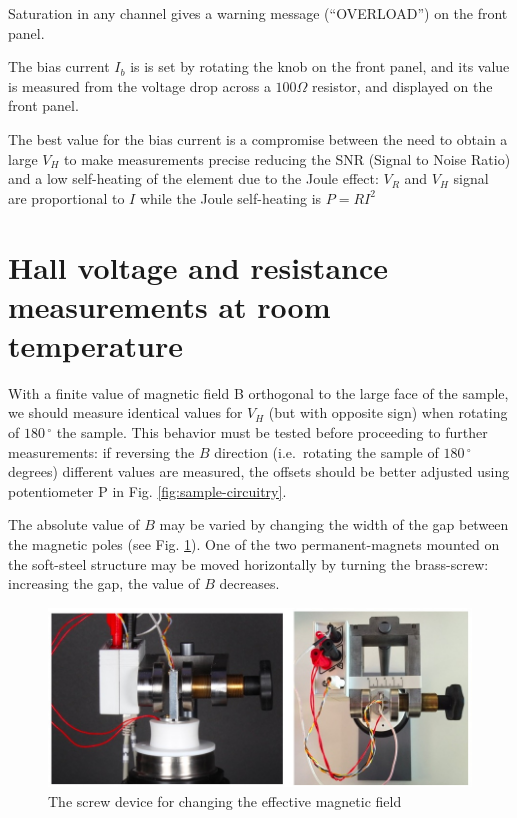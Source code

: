 \documentclass[]{book}
\begin{document}
Saturation in any channel gives a warning message (``OVERLOAD'') on the
front panel.

The bias current \(I_b\) is is set by rotating the knob on the front
panel, and its value is measured from the voltage drop across a
\(100 \Omega\) resistor, and displayed on the front panel.

The best value for the bias current is a compromise between the need to
obtain a large \(V_H\) to make measurements precise reducing the SNR
(Signal to Noise Ratio) and a low self-heating of the element due to the
Joule effect: \(V_R\) and \(V_H\) signal are proportional to \(I\) while
the Joule self-heating is \(P=RI^2\)

\section{Hall voltage and resistance measurements at room
temperature}\label{hall-voltage-and-resistance-measurements-at-room-temperature}

With a finite value of magnetic field B orthogonal to the large face of
the sample, we should measure identical values for \(V_H\) (but with
opposite sign) when rotating of \(180\,^{\circ}\) the sample. This
behavior must be tested before proceeding to further measurements: if
reversing the \(B\) direction (i.e.~rotating the sample of
\(180\,^{\circ}\) degrees) different values are measured, the offsets
should be better adjusted using potentiometer P in Fig.
\ref{fig:sample-circuitry}.

The absolute value of \(B\) may be varied by changing the width of the
gap between the magnetic poles (see Fig. \ref{fig:ScrewDevice}). One of
the two permanent-magnets mounted on the soft-steel structure may be
moved horizontally by turning the brass-screw: increasing the gap, the
value of \(B\) decreases.

\begin{figure}

{\centering \includegraphics[width=0.65\linewidth]{Assets/Figures/screw_device} 

}

\caption{The screw device for changing the effective magnetic field}\label{fig:ScrewDevice}
\end{figure}
\end{document}
